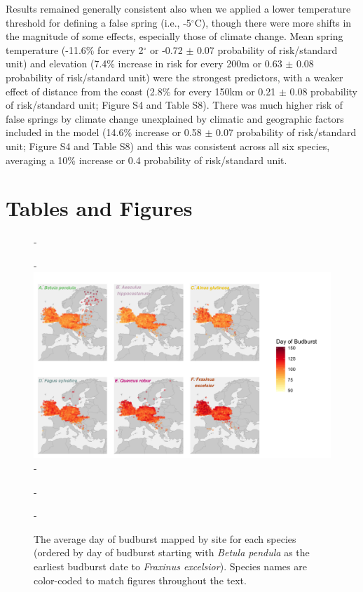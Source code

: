 \documentclass{article}\usepackage[]{graphicx}\usepackage[]{color}
\begin{document}
Results remained generally consistent also when we applied a lower temperature threshold for defining a false spring (i.e., -5$^{\circ}$C), though there were more shifts in the magnitude of some effects, especially those of climate change. Mean spring temperature (-11.6\% for every 2$^\circ$ or -0.72 $\pm$ 0.07 probability of risk/standard unit) and elevation (7.4\% increase in risk for every 200m or 0.63 $\pm$ 0.08 probability of risk/standard unit) were the strongest predictors, with a weaker effect of distance from the coast (2.8\% for every 150km or 0.21 $\pm$ 0.08 probability of risk/standard unit; Figure S4 and Table S8). There was much higher risk of false springs by climate change unexplained by climatic and geographic factors included in the model (14.6\% increase or 0.58 $\pm$ 0.07 probability of risk/standard unit; Figure S4 and Table S8) and this was consistent across all six species, averaging a 10\% increase or 0.4 probability of risk/standard unit. 



\section*{Tables and Figures} 

{\begin{figure} [H]
  -\begin{center}
  -\includegraphics[width=14cm]{..//analyses/figures/BB_base.png}
  -\caption{The average day of budburst mapped by site for each species (ordered by day of budburst starting with \textit{Betula pendula} as the earliest budburst date to \textit{Fraxinus excelsior}). Species names are color-coded to match figures throughout the text. }\label{fig:bbmap}
  -\end{center}
  -\end{figure}}
  
\end{document}
